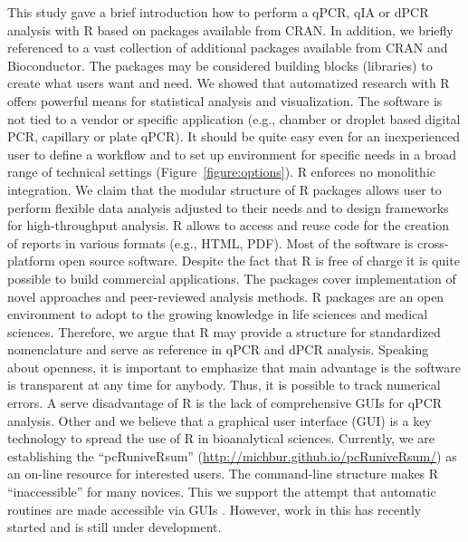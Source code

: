 This study gave a brief introduction how to perform a qPCR, qIA or dPCR analysis 
with R based on packages available from CRAN. In addition, we briefly referenced 
to a vast collection of additional packages available from CRAN and 
Bioconductor. The packages may be considered building blocks (libraries) to 
create what users want and need. We showed that automatized research with R 
offers powerful means for statistical analysis and visualization. The software 
is not tied to a vendor or specific application (e.g., chamber or droplet based 
digital PCR, capillary or plate qPCR). It should be quite easy even for an 
inexperienced user to define a workflow and to set up environment for specific 
needs in a broad range of technical settings (Figure~\ref{figure:options}). R 
enforces no monolithic integration. We claim that the modular structure of R 
packages allows user to perform flexible data analysis adjusted to their needs 
and to design frameworks for high-throughput analysis. R allows to access and 
reuse code for the creation of reports in various formats (e.g., HTML, PDF). 
Most of the software is cross-platform open source software. Despite the fact 
that R is free of charge it is quite possible to build commercial applications. 
The packages cover implementation of novel approaches and peer-reviewed analysis 
methods. R packages are an open environment to adopt to the growing knowledge in 
life sciences and medical sciences. Therefore, we argue that R may provide a 
structure for standardized nomenclature and serve as reference in qPCR and dPCR 
analysis. Speaking about openness, it is important to emphasize that main 
advantage is the software is transparent at any time for anybody. Thus, it is 
possible to track numerical errors.  A serve disadvantage of R is the lack of 
comprehensive GUIs for qPCR analysis. Other and we believe that a graphical user 
interface (GUI) is a key technology to spread the use of R in bioanalytical 
sciences. Currently, we are establishing the ``pcRuniveRsum'' 
(\url{http://michbur.github.io/pcRuniveRsum/}) as an on-line resource for 
interested users. The command-line structure makes R ``inaccessible'' for many 
novices. This we support the attempt that automatic routines are made accessible 
via GUIs \citep{rodiger_rkward_2012}. However, work in this has recently started 
and is still under development.


